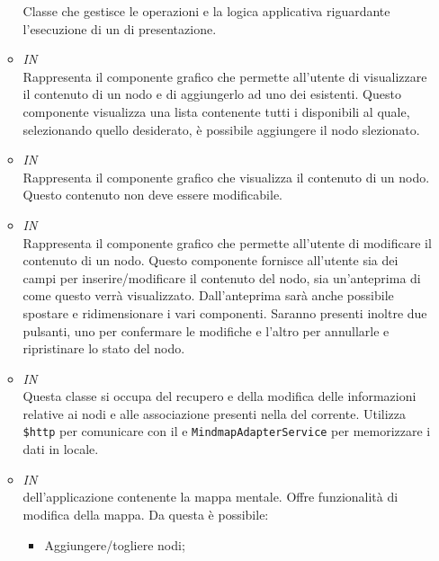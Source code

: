\begin{itemize}
\begin{itemize}
Classe che gestisce le operazioni e la logica applicativa riguardante l’esecuzione di un  di presentazione.
\item \textit{IN} \hyperref[\nogloxy{Premi::Front-End::Directives::premiAddToPath}]{}\\
Rappresenta il componente grafico che permette all’utente di visualizzare il contenuto di un nodo e di aggiungerlo ad uno dei  esistenti.
Questo componente visualizza una lista contenente tutti i  disponibili al quale, selezionando quello desiderato, è possibile aggiungere il nodo slezionato.
\item \textit{IN} \hyperref[\nogloxy{Premi::Front-End::Directives::premiNode}]{}\\
Rappresenta il componente grafico che visualizza il contenuto di un nodo. Questo contenuto non deve essere modificabile.
\item \textit{IN} \hyperref[\nogloxy{Premi::Front-End::Directives::premiNodeContentsEditor}]{}\\
Rappresenta il componente grafico che permette all’utente di modificare il contenuto di un nodo. Questo componente fornisce all’utente sia dei campi per inserire/modificare il contenuto del nodo, sia un’anteprima di come questo verrà visualizzato. Dall’anteprima sarà anche possibile spostare e ridimensionare i vari componenti.
Saranno presenti inoltre due pulsanti, uno per confermare le modifiche e l’altro per annullarle e ripristinare lo stato del nodo.
\item \textit{IN} \hyperref[\nogloxy{Premi::Front-End::Services::MindmapService}]{}\\
Questa classe si occupa del recupero e della modifica delle informazioni relative ai nodi e alle associazione presenti nella  del  corrente. Utilizza \texttt{\$http} per comunicare con il  e \texttt{MindmapAdapterService} per memorizzare i dati in locale.
\item \textit{IN} \hyperref[\nogloxy{Premi::Front-End::Views::MindmapEditorView}]{}\\
 dell’applicazione contenente la mappa mentale. Offre funzionalità di modifica della mappa.
Da questa  è possibile:
\begin{itemize}
\item Aggiungere/togliere nodi;

\end{itemize}
\end{itemize}
\end{itemize}
